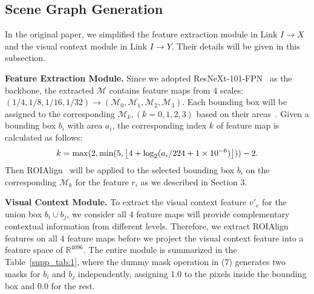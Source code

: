 \documentclass[10pt,twocolumn,letterpaper]{article}
\DeclarePairedDelimiter{\floor}{\lfloor}{\rfloor}
\begin{document}
\subsection{Scene Graph Generation}
In the original paper, we simplified the feature extraction module in Link $I\to X$ and the visual context module in Link $I\to Y$. Their details will be given in this subsection.

\noindent\textbf{Feature Extraction Module.} Since we adopted ResNeXt-101-FPN~\cite{lin2017feature, xie2017aggregated} as the backbone, the extracted $\mathcal{M}$ contains feature maps from 4 scales: $(1/4, 1/8, 1/16, 1/32) \to (\mathcal{M}_0, \mathcal{M}_1, \mathcal{M}_2, \mathcal{M}_3)$. Each bounding box will be assigned to the corresponding $\mathcal{M}_k, (k=0,1,2,3)$ based on their areas~\cite{massa2018mrcnn}. Given a bounding box $b_i$ with area $a_i$, the corresponding index $k$ of feature map is calculated as follows:
\begin{equation}
    k = \max(2, \min(5,\floor*{4+\log_2(a_i / 224 + 1\times 10^{-6})})) - 2.
\end{equation}
Then ROIAlign~\cite{he2017mask} will be applied to the selected bounding box $b_i$ on the corresponding $\mathcal{M}_k$ for the feature $r_i$ as we described in Section 3.

\noindent\textbf{Visual Context Module.} To extract the visual context feature $v'_e$ for the union box $b_i \cup b_j$, we consider all 4 feature maps will provide complementary contextual information from different levels. Therefore, we extract ROIAlign~\cite{he2017mask} features on all 4 feature maps before we project the visual context feature into a feature space of $\mathbb{R}^{4096}$. The entire module is summarized in the Table~\ref{supp_tab:1}, where the dummy mask operation in (7) generates two masks for $b_i$ and $b_j$ independently, assigning 1.0 to the pixels inside the bounding box and 0.0 for the rest.
\end{document}

